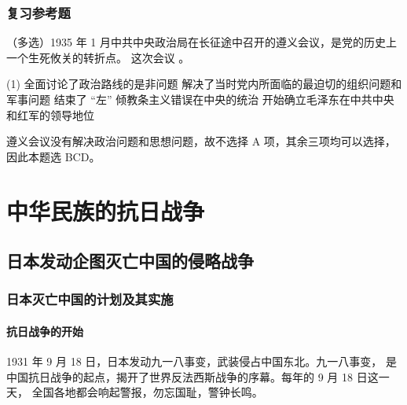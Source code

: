 \documentclass[10pt, UTF8]{ctexbook} %
\begin{document}
\subsection{复习参考题}

\begin{example}
    （多选）1935 年 1 月中共中央政治局在长征途中召开的遵义会议，是党的历史上一个生死攸关的转折点。
    这次会议 \underline{\qquad \qquad \qquad}。
    \begin{tasks}[label={\Alph*. }](1)
        \task 全面讨论了政治路线的是非问题
        \task 解决了当时党内所面临的最迫切的组织问题和军事问题
        \task 结束了 “左” 倾教条主义错误在中央的统治
        \task 开始确立毛泽东在中共中央和红军的领导地位
    \end{tasks}
    \begin{sol}
        遵义会议没有解决政治问题和思想问题，故不选择 A 项，其余三项均可以选择，
        因此本题选 BCD。
    \end{sol}
\end{example}


\newpage
\thispagestyle{empty}

\chapter{中华民族的抗日战争}

\section{日本发动企图灭亡中国的侵略战争}

\subsection{日本灭亡中国的计划及其实施}

\subsubsection{抗日战争的开始}

1931 年 9 月 18 日，日本发动九一八事变，武装侵占中国东北。九一八事变，
是中国抗日战争的起点，揭开了世界反法西斯战争的序幕。每年的 9 月 18 日这一天，
全国各地都会响起警报，勿忘国耻，警钟长鸣。
\end{document}
